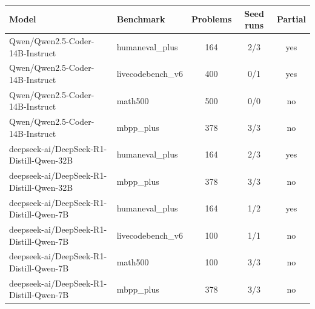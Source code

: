 \begin{tabular}{llccc}
\toprule
Model & Benchmark & Problems & Seed runs & Partial \\
\midrule
Qwen/Qwen2.5-Coder-14B-Instruct & humaneval_plus & 164 & 2/3 & yes \\
Qwen/Qwen2.5-Coder-14B-Instruct & livecodebench_v6 & 400 & 0/1 & yes \\
Qwen/Qwen2.5-Coder-14B-Instruct & math500 & 500 & 0/0 & no \\
Qwen/Qwen2.5-Coder-14B-Instruct & mbpp_plus & 378 & 3/3 & no \\
deepseek-ai/DeepSeek-R1-Distill-Qwen-32B & humaneval_plus & 164 & 2/3 & yes \\
deepseek-ai/DeepSeek-R1-Distill-Qwen-32B & mbpp_plus & 378 & 3/3 & no \\
deepseek-ai/DeepSeek-R1-Distill-Qwen-7B & humaneval_plus & 164 & 1/2 & yes \\
deepseek-ai/DeepSeek-R1-Distill-Qwen-7B & livecodebench_v6 & 100 & 1/1 & no \\
deepseek-ai/DeepSeek-R1-Distill-Qwen-7B & math500 & 100 & 3/3 & no \\
deepseek-ai/DeepSeek-R1-Distill-Qwen-7B & mbpp_plus & 378 & 3/3 & no \\
\bottomrule
\end{tabular}
